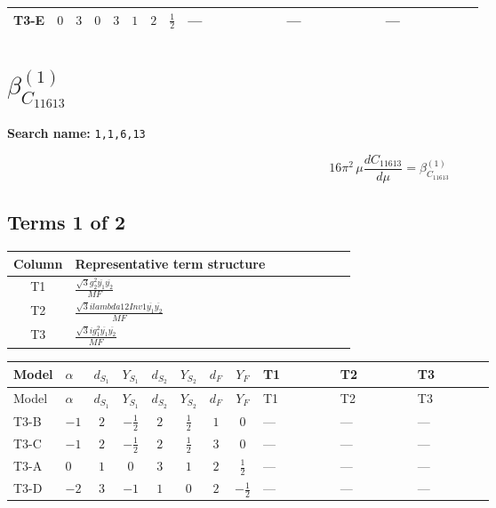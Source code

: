 \documentclass[8pt]{article}
\begin{document}
\begin{landscape}
\begin{longtable}{@{}llcccccc >{\raggedright\arraybackslash}p{0.21\linewidth} >{\raggedright\arraybackslash}p{0.21\linewidth} >{\raggedright\arraybackslash}p{0.21\linewidth}@{}}
\midrule
T3-E & $0$ & $3$ & $0$ & $3$ & $1$ & $2$ & $\frac{1}{2}$ & --- & --- & --- \\
\midrule
\bottomrule
\end{longtable}
\clearpage
\section*{$\beta_{C_{11613}}^{(1)}$}
\noindent\textbf{Search name: }\texttt{1,1,6,13}\par\smallskip
\[16\pi^2\,\mu\frac{d C_{11613}}{d\mu}=\beta_{C_{11613}}^{(1)}\]
\subsection*{Terms 1 of 2}
\begin{center}
\begin{tabular}{@{}c >{\raggedright\arraybackslash}p{0.82\linewidth}@{}}
\toprule
Column & Representative term structure \\
\midrule
T1 & \(\displaystyle \frac{\sqrt{3} g_{2}^{2} \overline{y_{1}} \overline{y_{2}}}{MF}\) \\
\midrule
T2 & \(\displaystyle \frac{\sqrt{3} i lambda12Inv1 \overline{y_{1}} \overline{y_{2}}}{MF}\) \\
\midrule
T3 & \(\displaystyle \frac{\sqrt{3} i g_{1}^{2} \overline{y_{1}} \overline{y_{2}}}{MF}\) \\
\midrule
\bottomrule
\end{tabular}
\end{center}
\smallskip
\tiny
\begin{longtable}{@{}llcccccc >{\raggedright\arraybackslash}p{0.21\linewidth} >{\raggedright\arraybackslash}p{0.21\linewidth} >{\raggedright\arraybackslash}p{0.21\linewidth}@{}}
\toprule
Model & $\alpha$ & $d_{S_1}$ & $Y_{S_1}$ & $d_{S_2}$ & $Y_{S_2}$ & $d_F$ & $Y_F$ & T1 & T2 & T3 \\
\midrule
\endfirsthead
\toprule
Model & $\alpha$ & $d_{S_1}$ & $Y_{S_1}$ & $d_{S_2}$ & $Y_{S_2}$ & $d_F$ & $Y_F$ & T1 & T2 & T3 \\
\midrule
\endhead
T3-B & $-1$ & $2$ & $-\frac{1}{2}$ & $2$ & $\frac{1}{2}$ & $1$ & $0$ & --- & --- & --- \\
\midrule
T3-C & $-1$ & $2$ & $-\frac{1}{2}$ & $2$ & $\frac{1}{2}$ & $3$ & $0$ & --- & --- & --- \\
\midrule
T3-A & $0$ & $1$ & $0$ & $3$ & $1$ & $2$ & $\frac{1}{2}$ & --- & --- & --- \\
\midrule
T3-D & $-2$ & $3$ & $-1$ & $1$ & $0$ & $2$ & $-\frac{1}{2}$ & --- & --- & --- \\

\end{longtable}
\end{landscape}
\end{document}
